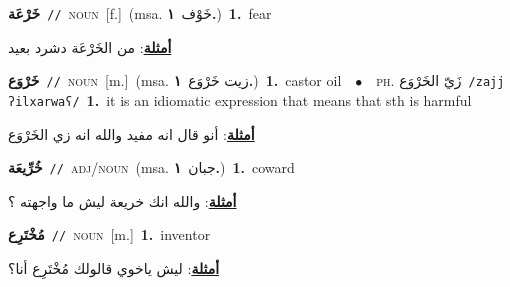 \documentclass[10pt,a4paper,twoside]{article} %
\begin{document}
\begin{multicols}{2}
{\setlength\topsep{0pt}\textbf{\foreignlanguage{arabic}{خَرْعَة}}\ {\color{gray}\texttt{//}\color{black}}\ \textsc{noun}\ [f.]\ \color{gray}(msa. \foreignlanguage{arabic}{خَوْف}~\foreignlanguage{arabic}{\textbf{١.}})\color{black}\ \textbf{1.}~fear\  \begin{flushright}\color{gray}\foreignlanguage{arabic}{\textbf{\underline{\foreignlanguage{arabic}{أمثلة}}}: من الخَرْعَة دشرد بعيد}\end{flushright}\color{black}} \vspace{2mm}

{\setlength\topsep{0pt}\textbf{\foreignlanguage{arabic}{خَرْوَع}}\ {\color{gray}\texttt{//}\color{black}}\ \textsc{noun}\ [m.]\ \color{gray}(msa. \foreignlanguage{arabic}{زيت خَرْوَع}~\foreignlanguage{arabic}{\textbf{١.}})\color{black}\ \textbf{1.}~castor oil\ \ $\bullet$\ \ \textsc{ph.} \color{gray} \foreignlanguage{arabic}{زَيّ الخَرْوَع}\color{black}\ {\color{gray}\texttt{/{\sffamily zajj ʔilxarwaʕ}/}\color{black}}\ \textbf{1.}~it is an idiomatic expression that means that sth is harmful\  \begin{flushright}\color{gray}\foreignlanguage{arabic}{\textbf{\underline{\foreignlanguage{arabic}{أمثلة}}}: أنو قال انه مفيد والله انه زي الخَرْوَع}\end{flushright}\color{black}} \vspace{2mm}

{\setlength\topsep{0pt}\textbf{\foreignlanguage{arabic}{خُرِّيعَة}}\ {\color{gray}\texttt{//}\color{black}}\ \textsc{adj/noun}\ \color{gray}(msa. \foreignlanguage{arabic}{جبان}~\foreignlanguage{arabic}{\textbf{١.}})\color{black}\ \textbf{1.}~coward\  \begin{flushright}\color{gray}\foreignlanguage{arabic}{\textbf{\underline{\foreignlanguage{arabic}{أمثلة}}}: والله انك خريعة ليش ما واجهته ؟}\end{flushright}\color{black}} \vspace{2mm}

{\setlength\topsep{0pt}\textbf{\foreignlanguage{arabic}{مُخْتَرِع}}\ {\color{gray}\texttt{//}\color{black}}\ \textsc{noun}\ [m.]\ \textbf{1.}~inventor\  \begin{flushright}\color{gray}\foreignlanguage{arabic}{\textbf{\underline{\foreignlanguage{arabic}{أمثلة}}}: ليش ياخوي قالولك مُخْتَرِع أنا؟}\end{flushright}\color{black}} \vspace{2mm}


\end{multicols}
\end{document}
